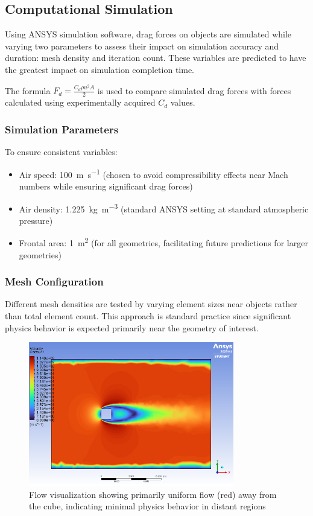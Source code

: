 \documentclass[12pt,a4paper]{article}
\begin{document}
\subsection{Computational Simulation}

Using ANSYS simulation software, drag forces on objects are simulated while varying two parameters to assess their impact on simulation accuracy and duration: mesh density and iteration count. These variables are predicted to have the greatest impact on simulation completion time.

The formula $F_d = \frac{C_d\rho u^2 A}{2}$ is used to compare simulated drag forces with forces calculated using experimentally acquired $C_d$ values.

\subsubsection{Simulation Parameters}

To ensure consistent variables:
\begin{itemize}
    \item Air speed: \SI{100}{\meter\per\second} (chosen to avoid compressibility effects near Mach numbers while ensuring significant drag forces)
    \item Air density: \SI{1.225}{\kilogram\per\meter\cubed} (standard ANSYS setting at standard atmospheric pressure)
    \item Frontal area: \SI{1}{\meter\squared} (for all geometries, facilitating future predictions for larger geometries)
\end{itemize}

\subsubsection{Mesh Configuration}

Different mesh densities are tested by varying element sizes near objects rather than total element count. This approach is standard practice since significant physics behavior is expected primarily near the geometry of interest.

\begin{figure}[H]
    \centering
    \includegraphics[width=0.8\textwidth]{image1.png}
    \caption{Flow visualization showing primarily uniform flow (red) away from the cube, indicating minimal physics behavior in distant regions}
    \label{fig:flow_viz}
\end{figure}
\end{document}
